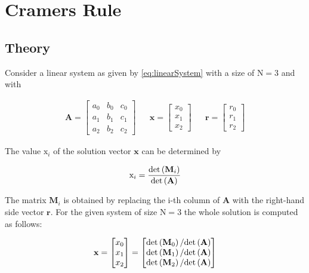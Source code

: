 \section{Cramers Rule}
\label{sec:cramersRule}
\subsection{Theory}

Consider a linear system as given by \cref{eq:linearSystem} with a size of $\mathrm{N}=3$ and with


\begin{align*}
\mathbf{A}
=
\begin{bmatrix}
a_0&b_0&c_0\\
a_1&b_1&c_1\\
a_2&b_2&c_2
\end{bmatrix}
&&
\mathbf{x}
=
\begin{bmatrix}
x_0\\
x_1\\
x_2
\end{bmatrix}
&&
\mathbf{r}
=
\begin{bmatrix}
r_0\\
r_1\\
r_2
\end{bmatrix}
\end{align*}

The value $\mathrm{x}_i$ of the solution vector $\mathbf{x}$ can be determined by

\begin{align*}
\mathrm{x}_i = \frac{\mathrm{det}\left(\mathbf{M}_i\right)}{\mathrm{det}\left(\mathbf{A}\right)}
\end{align*}

The matrix $\mathbf{M}_i$ is obtained by replacing the i-th  column of $\mathbf{A}$ with the right-hand side vector $\mathbf{r}$.
For the given system of size  $\mathrm{N}=3$ the whole solution is computed as follows:

\begin{align*}
\mathbf{x}
=
\begin{bmatrix}
x_0\\
x_1\\
x_2
\end{bmatrix}
=
\begin{bmatrix}
\mathrm{det}\left(\mathbf{M}_0\right) / \mathrm{det}\left(\mathbf{A}\right)\\
\mathrm{det}\left(\mathbf{M}_1\right) / \mathrm{det}\left(\mathbf{A}\right)\\
\mathrm{det}\left(\mathbf{M}_2\right) / \mathrm{det}\left(\mathbf{A}\right)\\
\end{bmatrix}
\end{align*}

